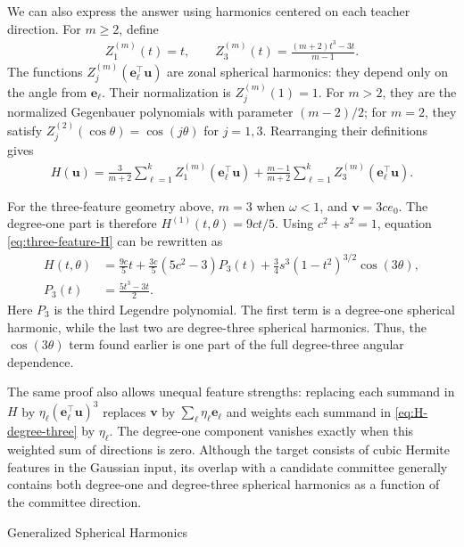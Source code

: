 \documentclass[11pt, reqno]{amsart}
\makeatletter
\def\section{\@startsection{section}{1}%
  \z@{.7\linespacing\@plus\linespacing}{.5\linespacing}%
  {\normalfont\scshape\centering}}
\theoremstyle{notestyle}
\theoremstyle{defstyle}
\makeatother
\begin{document}
We can also express the answer using harmonics centered on each teacher direction.
For $m\geq2$, define
\begin{align*}
    Z_1^{(m)}(t)=t,
    \qquad Z_3^{(m)}(t)=\frac{(m+2)t^3-3t}{m-1}.
\end{align*}
The functions $Z_j^{(m)}(\mathbf e_\ell^\top\mathbf u)$ are zonal spherical harmonics: they depend only on the angle from $\mathbf e_\ell$.
Their normalization is $Z_j^{(m)}(1)=1$.
For $m>2$, they are the normalized Gegenbauer polynomials with parameter $(m-2)/2$; for $m=2$, they satisfy $Z_j^{(2)}(\cos\theta)=\cos(j\theta)$ for $j=1,3$.
Rearranging their definitions gives
\begin{align}
    H(\mathbf u)
    = \frac{3}{m+2}\sum_{\ell=1}^k Z_1^{(m)}(\mathbf e_\ell^\top\mathbf u)
    +\frac{m-1}{m+2}\sum_{\ell=1}^k Z_3^{(m)}(\mathbf e_\ell^\top\mathbf u).
    \label{eq:H-zonal-harmonics}
\end{align}

For the three-feature geometry above, $m=3$ when $\omega<1$, and $\mathbf v=3ce_0$.
The degree-one part is therefore $H^{(1)}(t,\theta)=9ct/5$.
Using $c^2+s^2=1$, equation \eqref{eq:three-feature-H} can be rewritten as
\begin{align*}
    H(t,\theta)
    &= \frac{9c}{5}t
    +\frac{3c}{5}(5c^2-3)P_3(t)
    +\frac{3}{4}s^3(1-t^2)^{3/2}\cos(3\theta), \\
    P_3(t)&=\frac{5t^3-3t}{2}.
\end{align*}
Here $P_3$ is the third Legendre polynomial.
The first term is a degree-one spherical harmonic, while the last two are degree-three spherical harmonics.
Thus, the $\cos(3\theta)$ term found earlier is one part of the full degree-three angular dependence.

The same proof also allows unequal feature strengths: replacing each summand in $H$ by $\eta_\ell(\mathbf e_\ell^\top\mathbf u)^3$ replaces $\mathbf v$ by $\sum_\ell\eta_\ell\mathbf e_\ell$ and weights each summand in \eqref{eq:H-degree-three} by $\eta_\ell$.
The degree-one component vanishes exactly when this weighted sum of directions is zero.
Although the target consists of cubic Hermite features in the Gaussian input, its overlap with a candidate committee generally contains both degree-one and degree-three spherical harmonics as a function of the committee direction.

\appendix
\section{Generalized Spherical Harmonics}
\label{app:generalized-spherical-harmonics}
\end{document}
